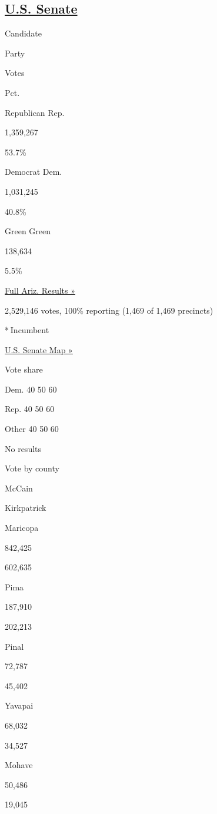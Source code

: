 \hypertarget{us-senate}{%
\subsection{\texorpdfstring{\href{https://www.nytimes3xbfgragh.onion/elections/2016/results/arizona-senate-mccain-kirkpatrick}{U.S.
Senate}}{U.S. Senate}}\label{us-senate}}

Candidate

Party

Votes

Pct.

Republican Rep.

1,359,267

53.7\%

Democrat Dem.

1,031,245

40.8\%

Green Green

138,634

5.5\%

\href{https://www.nytimes3xbfgragh.onion/elections/2016/results/arizona}{Full
Ariz. Results »}

2,529,146 votes, 100\% reporting (1,469 of 1,469 precincts)

* Incumbent

\href{//www.nytimes3xbfgragh.onion/elections/2016/results/senate}{U.S.
Senate Map »}

Vote share

Dem. 40 50 60

Rep. 40 50 60

Other 40 50 60

 No results

Vote by county

McCain

Kirkpatrick

Maricopa

842,425

602,635

Pima

187,910

202,213

Pinal

72,787

45,402

Yavapai

68,032

34,527

Mohave

50,486

19,045

